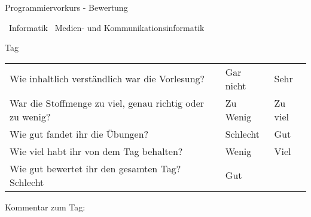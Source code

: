 \documentclass[final,a4paper]{article}
\newcommand{\questionbox}{\fbox{\color{white}|~}~}
\begin{document}
\lstset{tabsize=4}
\lstset{basicstyle=\small}
\lstset{language=java}

{\huge Programmiervorkurs - Bewertung}

\bigskip 

\questionbox Informatik \questionbox Medien- und Kommunikationsinformatik

\bigskip

Tag \questionbox

\bigskip

\begin{tabular}{ll@{~\questionbox\questionbox\questionbox\questionbox\questionbox~}l}
\baselineskip20pt
Wie inhaltlich verständlich war die Vorlesung? & Gar nicht & Sehr \\
War die Stoffmenge zu viel, genau richtig oder zu wenig? & Zu Wenig & Zu viel \\
Wie gut fandet ihr die Übungen? & Schlecht & Gut \\
Wie viel habt ihr von dem Tag behalten? & Wenig & Viel \\
Wie gut bewertet ihr den gesamten Tag? Schlecht & Gut \\
\end{tabular}

Kommentar zum Tag:
\fbox{
\begin{minipage}
\hfill
\vfill
\end{minipage}
}
\bigskip
\end{document}
